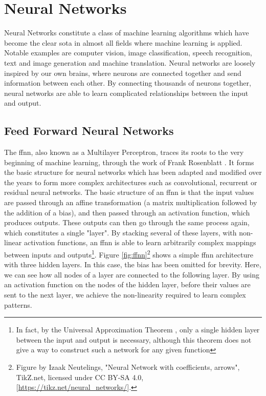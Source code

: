 \documentclass[UKenglish]{uiomasterthesis} %
\theoremstyle{definition}
\begin{document}
\section{Neural Networks}

Neural Networks constitute a class of machine learning algorithms which have become the clear \ac{sota} in almost all fields where machine learning is applied. Notable examples are computer vision, image classification, speech recognition, text and image generation and machine translation. Neural networks are loosely inspired by our own brains, where neurons are connected together and send information between each other. By connecting thousands of neurons together, neural networks are able to learn complicated relationships between the input and output.

\subsection{Feed Forward Neural Networks}

The \ac{ffnn}, also known as a Multilayer Perceptron, traces its roots to the very beginning of machine learning, through the work of Frank Rosenblatt \cite{rosenblatt}. It forms the basic structure for neural networks which has been adapted and modified over the years to form more complex architectures such as convolutional, recurrent or residual neural networks. The basic structure of an \ac{ffnn} is that the input values are passed through an affine transformation (a matrix multiplication followed by the addition of a bias), and then passed through an activation function, which produces outputs. These outputs can then go through the same process again, which constitutes a single "layer". By stacking several of these layers, with non-linear activation functions, an \ac{ffnn} is able to learn arbitrarily complex mappings between inputs and outputs\footnote{In fact, by the Universal Approximation Theorem \cite{uat}, only a single hidden layer between the input and output is necessary, although this theorem does not give a way to construct such a network for any given function}. Figure \ref{fig:ffnn}\footnote{Figure by Izaak Neutelings, "Neural Network with coefficients, arrows", TikZ.net, licensed under CC BY-SA 4.0, [\url{https://tikz.net/neural\_networks/}].} shows a simple \ac{ffnn} architecture with three hidden layers. In this case, the bias has been omitted for brevity. Here, we can see how all nodes of a layer are connected to the following layer. By using an activation function on the nodes of the hidden layer, before their values are sent to the next layer, we achieve the non-linearity required to learn complex patterns.
\end{document}
